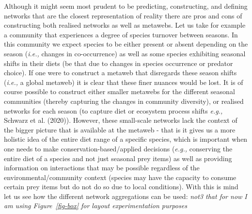 \documentclass[
]{article}
\begin{document}
\begin{tcolorbox}[enhanced jigsaw, leftrule=.75mm, rightrule=.15mm, coltitle=black, colframe=quarto-callout-note-color-frame, breakable, toprule=.15mm, toptitle=1mm, colbacktitle=quarto-callout-note-color!10!white, bottomrule=.15mm, opacitybacktitle=0.6, title=\textcolor{quarto-callout-note-color}{\faInfo}\hspace{0.5em}{Box 1 - Why we need to aggregate networks at different scales: A
hypothetical case study}, colback=white, titlerule=0mm, arc=.35mm, bottomtitle=1mm, left=2mm, opacityback=0]

Although it might seem most prudent to be predicting, constructing, and
defining networks that are the closest representation of reality there
are pros and cons of constructing both realised networks as well as
metawebs. Let us take for example a community that experiences a degree
of species turnover between seasons. In this community we expect species
to be either present or absent depending on the season (\emph{i.e.,}
changes in co-occurrence) as well as some species exhibiting seasonal
shifts in their diets (be that due to changes in species occurrence or
predator choice). If one were to construct a metaweb that disregards
these season shifts (\emph{i.e.,} a global metaweb) it is clear that
these finer nuances would be lost. It is of course possible to construct
either smaller metawebs for the different seasonal communities (thereby
capturing the changes in community diversity), or realised networks for
each season (to capture diet or ecosystem process shifts \emph{e.g.,}
Schwarz et al. (2020)). However, these small-scale networks lack the
context of the bigger picture that is available at the metaweb - that is
it gives us a more holistic idea of the entire diet range of a specific
species, which is important when one needs to make
conservation-based/applied decisions (\emph{e.g.,} conserving the entire
diet of a species and not just seasonal prey items) as well as providing
information on interactions that may be possible regardless of the
environmental/community context (species may have the capacity to
consume certain prey items but do not do so due to local conditions).
With this is mind let us see how the different network aggregations can
be used: \emph{not3 that for now I am using Figure~\ref{fig-box} for
layout experimentation purposes}

\begin{figure}[H]

\centering{

}
\end{figure}
\end{tcolorbox}
\end{document}
